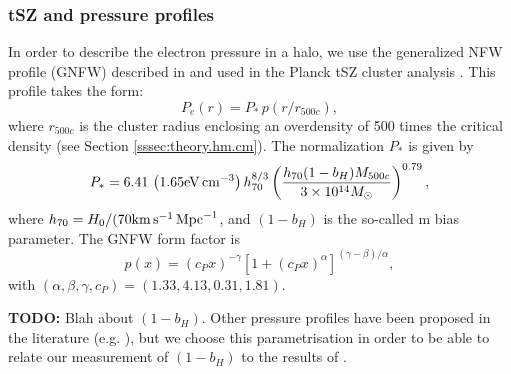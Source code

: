 \documentclass[useAMS,usenatbib]{mn2e}
\newcommand{\TODO}[1]{{\bf TODO:} #1}
\begin{document}
    \subsubsection{tSZ and pressure profiles}\label{sssec:theory.hm.pe}
      In order to describe the electron pressure in a halo, we use the generalized NFW profile (GNFW) described in \cite{2010A&A...517A..92A} and used in the Planck tSZ cluster analysis \cite{2016A&A...594A..24P}. This profile takes the form:
      \begin{equation}
        P_e(r)=P_*\,p(r/r_{500c}),
      \end{equation}
      where $r_{500c}$ is the cluster radius enclosing an overdensity of 500 times the critical density (see Section \ref{sssec:theory.hm.cm}). The normalization $P_*$ is given by
      \begin{equation}
        P_*=6.41\,\left(1.65 {\rm eV}\,{\rm cm}^{-3}\right)h_{70}^{8/3}
        \left(\frac{h_{70}(1-b_H)M_{500c}}{3\times10^{14}M_\odot}\right)^{0.79},
      \end{equation}
      where $h_{70}=H_0/(70 {\rm km}\,{\rm s}^{-1}\,{\rm Mpc}^{-1}$, and $(1-b_H)$ is the so-called m bias parameter. The GNFW form factor is
      \begin{equation}
        p(x)=(c_P x)^{-\gamma}\left[1+(c_P x)^\alpha\right]^{(\gamma-\beta)/\alpha},
      \end{equation}
      with $(\alpha,\beta,\gamma,c_P)=(1.33,4.13,0.31,1.81)$.
      
      \TODO{Blah about $(1-b_H)$}. Other pressure profiles have been proposed in the literature (e.g. \cite{2012ApJ...758...75B}), but we choose this parametrisation in order to be able to relate our measurement of $(1-b_H)$ to the results of \cite{2016A&A...594A..24P}.
      
\end{document}
